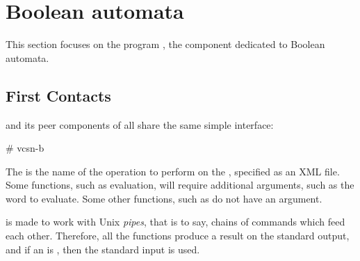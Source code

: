 \newpage

\section{Boolean automata}
\label{sec:vcsn-b}

This section focuses on the program , the
\tafkit component dedicated to Boolean automata.

\subsection{First Contacts}

 and its peer components of \tafkit all share the same
simple interface:

\begin{shell}
# vcsn-b   
\end{shell}

\noindent
The  is the name of the operation to perform on the
, specified as an XML file.  Some functions, such as
evaluation, will require additional arguments, such as the word to
evaluate.  Some other functions, such as  do not have
an  argument.

\tafkit is made to work with Unix \emph{pipes}, that is to say, chains
of commands which feed each other.  Therefore, all the functions
produce a result on the standard output, and if an  is
\samp{-}, then the standard input is used.

\smallskip

